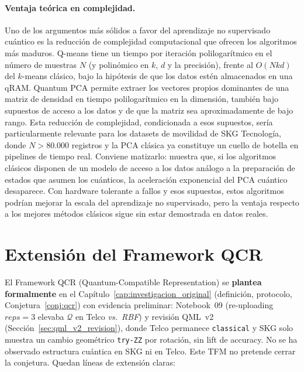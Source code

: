 \paragraph{Ventaja teórica en complejidad.}
Uno de los argumentos más sólidos a favor del aprendizaje no supervisado cuántico es la reducción de complejidad computacional que ofrecen los algoritmos más maduros. Q-means \citep{kerenidis2019qmeans} tiene un tiempo por iteración polilogarítmico en el número de muestras $N$ (y polinómico en $k$, $d$ y la precisión), frente al $O(Nkd)$ del $k$-means clásico, bajo la hipótesis de que los datos estén almacenados en una qRAM. Quantum PCA \citep{lloyd2014} permite extraer los vectores propios dominantes de una matriz de densidad en tiempo polilogarítmico en la dimensión, también bajo supuestos de acceso a los datos y de que la matriz sea aproximadamente de bajo rango. Esta reducción de complejidad, condicionada a esos supuestos, sería particularmente relevante para los datasets de movilidad de SKG Tecnología, donde $N > 80.000$ registros y la PCA clásica ya constituye un cuello de botella en pipelines de tiempo real. Conviene matizarlo: \citet{tang2021} muestra que, si los algoritmos clásicos disponen de un modelo de acceso a los datos análogo a la preparación de estados que asumen los cuánticos, la aceleración exponencial del PCA cuántico desaparece. Con hardware tolerante a fallos y esos supuestos, estos algoritmos podrían mejorar la escala del aprendizaje no supervisado, pero la ventaja respecto a los mejores métodos clásicos sigue sin estar demostrada en datos reales.

\section{Extensión del Framework QCR}

El Framework QCR (Quantum-Compatible Representation) se \textbf{plantea formalmente} en el Capítulo~\ref{cap:investigacion_original} (definición, protocolo, Conjetura~\ref{conj:qcr}) con evidencia preliminar: Notebook~09 (re-uploading $reps=3$ elevaba $\mathcal{Q}$ en Telco \emph{vs.\ RBF}) y revisión QML~v2 (Sección~\ref{sec:qml_v2_revision}), donde Telco permanece \texttt{classical} y SKG solo muestra un cambio geométrico \texttt{try-ZZ} por rotación, sin lift de accuracy. No se ha observado estructura cuántica en SKG ni en Telco. Este TFM no pretende cerrar la conjetura. Quedan líneas de extensión claras:

